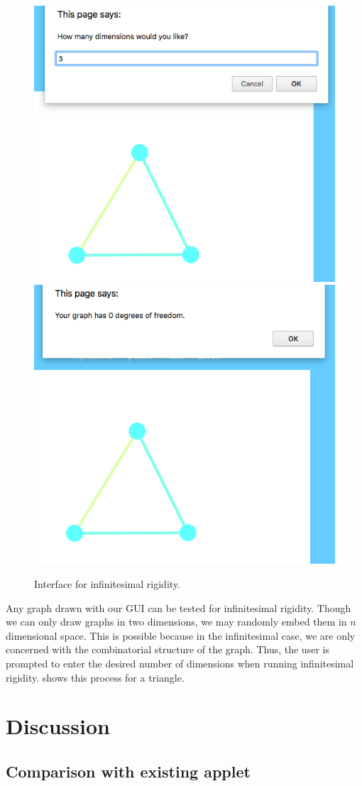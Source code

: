 \documentclass[aps,prd,final,twocolumn,letterpaper,nofootinbib]{revtex4-1}
\begin{document}
\begin{figure}[ht]
   \centering
   \includegraphics[width=.49\linewidth]{img/i1}
   \includegraphics[width=.49\linewidth]{img/i2}
   \caption{Interface for infinitesimal rigidity.}
   \label{fig:inf}
\end{figure}

Any graph drawn with our GUI can be tested for infinitesimal rigidity.
Though we can only draw graphs in two dimensions,
we may randomly embed them in $n$ dimensional space.
This is possible because in the infinitesimal case,
we are only concerned with the combinatorial structure of the graph.
Thus, the user is prompted to enter the desired number of dimensions
when running infinitesimal rigidity.
 shows this process for a triangle.

\section{Discussion}
\label{sec:discuss}

\subsection{Comparison with existing applet}
\end{document}
